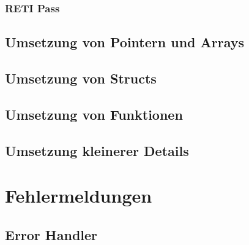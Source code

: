 \subsubsection{RETI Pass}
\subsection{Umsetzung von Pointern und Arrays}
\subsection{Umsetzung von Structs}
\subsection{Umsetzung von Funktionen}
\subsection{Umsetzung kleinerer Details}
\section{Fehlermeldungen}
\subsection{Error Handler}
